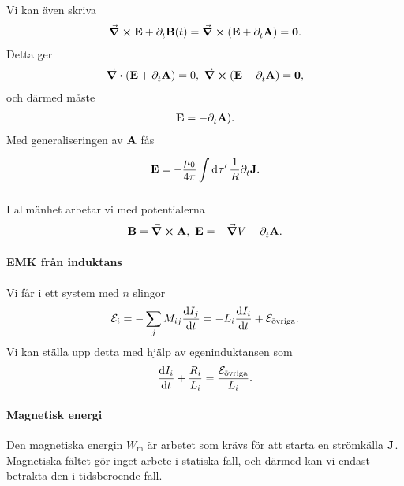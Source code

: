 Vi kan även skriva
\begin{align*}
	\curl{\vb{E}} + \partial_{t}^{}\vb{B}(t) = \curl(\vb{E} + \partial_{t}^{}\vb{A}) = \vb{0}.
\end{align*}
Detta ger
\begin{align*}
	\div(\vb{E} + \partial_{t}^{}\vb{A}) = 0,\ \curl(\vb{E} + \partial_{t}^{}\vb{A}) = \vb{0},
\end{align*}
och därmed måste
\begin{align*}
	\vb{E} = -\partial_{t}^{}\vb{A}).
\end{align*}
Med generaliseringen av $\vb{A}$ fås
\begin{align*}
	\vb{E} = -\frac{\mu_{0}}{4\pi}\int\limits_{}^{}\dd[]{\tau'}\frac{1}{R}\partial_{t}^{}\vb{J}.
\end{align*}

I allmänhet arbetar vi med potentialerna
\begin{align*}
	\vb{B} = \curl{\vb{A}},\ \vb{E} = -\grad{V} - \partial_{t}^{}\vb{A}.
\end{align*}

\paragraph{EMK från induktans}
Vi får i ett system med $n$ slingor
\begin{align*}
	\mathcal{E}_{i} = -\sum\limits_{j}M_{ij}\dv{I_{j}}{t} = -L_{i}\dv{I_{i}}{t} + \mathcal{E}_{\text{övriga}}.
\end{align*}
Vi kan ställa upp detta med hjälp av egeninduktansen som
\begin{align*}
	\dv{I_{i}}{t} + \frac{R_{i}}{L_{i}} = \frac{\mathcal{E}_{\text{övriga}}}{L_{i}}.
\end{align*}

\paragraph{Magnetisk energi}
Den magnetiska energin $W_{\text{m}}$ är arbetet som krävs för att starta en strömkälla $\vb{J}$. Magnetiska fältet gör inget arbete i statiska fall, och därmed kan vi endast betrakta den i tidsberoende fall.

